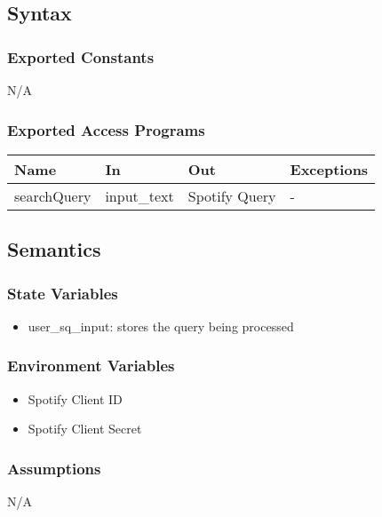 \documentclass[12pt, titlepage]{article}
\begin{document}
\subsection{Syntax}

\subsubsection{Exported Constants}
N/A

\subsubsection{Exported Access Programs}

\begin{center}
\begin{tabular}{p{2cm} p{4cm} p{4cm} p{2cm}}
\hline
\textbf{Name} & \textbf{In} & \textbf{Out} & \textbf{Exceptions}\\
\hline%
searchQuery &input\_text &Spotify Query &-\\
\hline
\end{tabular}
\end{center}

\subsection{Semantics}

\subsubsection{State Variables}
\begin{itemize}
  \item user\_sq\_input: stores the query being processed 
\end{itemize}

\subsubsection{Environment Variables}
\begin{itemize}
  \item Spotify Client ID
  \item Spotify Client Secret
\end{itemize}

\subsubsection{Assumptions}
N/A
\end{document}
